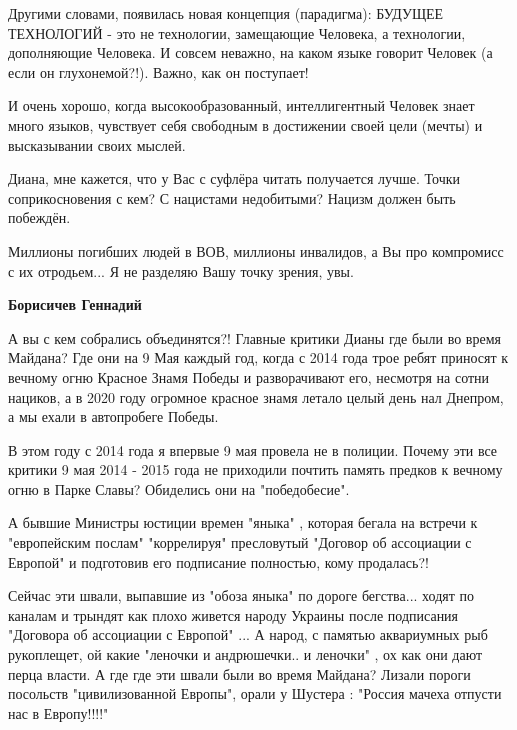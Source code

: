 \begin{itemize}
Другими словами, появилась новая концепция (парадигма): БУДУЩЕЕ ТЕХНОЛОГИЙ -
это не технологии, замещающие Человека, а технологии, дополняющие Человека. И
совсем неважно, на каком языке говорит Человек (а если он глухонемой?!). Важно,
как он поступает! 

И очень хорошо, когда высокообразованный, интеллигентный Человек знает много
языков, чувствует себя свободным в достижении своей цели (мечты) и высказывании
своих мыслей.


Диана, мне кажется, что у Вас с суфлёра читать получается лучше. Точки
соприкосновения с кем? С нацистами недобитыми? Нацизм должен быть побеждён.

Миллионы погибших людей в ВОВ, миллионы инвалидов, а Вы про компромисс с их
отродьем... Я не разделяю Вашу точку зрения, увы.

\begin{itemize}

\par

\textbf{Борисичев Геннадий} 

А вы с кем собрались объединятся?! Главные критики Дианы где были во время
Майдана? Где они на 9 Мая каждый год, когда с 2014 года трое ребят приносят к
вечному огню Красное Знамя Победы и разворачивают его, несмотря на сотни
нациков, а в 2020 году огромное красное знамя летало целый день нал Днепром, а
мы ехали в автопробеге Победы. 

В этом году с 2014 года я впервые 9 мая провела не в полиции. Почему эти все
критики 9 мая 2014 - 2015 года не приходили почтить память предков к вечному
огню в Парке Славы?  Обиделись они на "победобесие". 

А бывшие Министры юстиции времен "яныка" , которая бегала на встречи к
"европейским послам" "коррелируя" пресловутый "Договор об ассоциации с Европой"
и подготовив его подписание полностью, кому продалась?! 

Сейчас эти швали, выпавшие из "обоза яныка" по дороге бегства...  ходят по
каналам и трындят как плохо живется народу Украины после подписания "Договора
об ассоциации с Европой" ... А народ, с памятью аквариумных рыб рукоплещет, ой
какие "леночки и андрюшечки.. и леночки" , ох как они дают перца власти. А где
где эти швали были во время Майдана? Лизали пороги посольств "цивилизованной
Европы", орали у Шустера : "Россия мачеха отпусти нас в Европу!!!!" 


\end{itemize}
\end{itemize}
